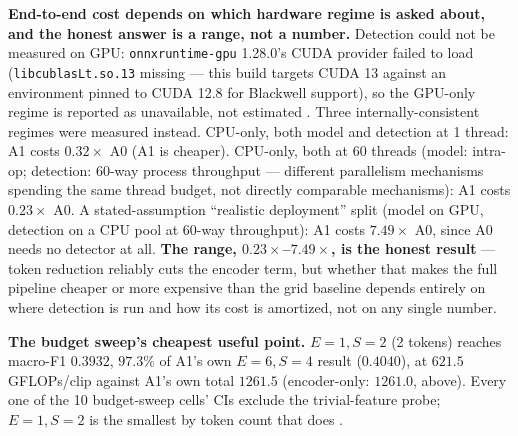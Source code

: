 \textbf{End-to-end cost depends on which hardware regime is asked about, and
the honest answer is a range, not a number.} Detection could not be measured
on GPU: \texttt{onnxruntime-gpu} 1.28.0's CUDA provider failed to load
(\texttt{libcublasLt.so.13} missing --- this build targets CUDA 13 against an
environment pinned to CUDA 12.8 for Blackwell support), so the GPU-only
regime is reported as unavailable, not estimated
. Three internally-consistent regimes were measured instead. CPU-only, both
model and detection at 1 thread: A1 costs
$0.32\times$ A0 (A1 is cheaper). CPU-only, both at 60 threads
(model: intra-op; detection: 60-way process throughput --- different
parallelism mechanisms spending the same thread budget, not directly
comparable mechanisms): A1 costs
$0.23\times$ A0. A stated-assumption ``realistic deployment'' split (model on
GPU, detection on a CPU pool at 60-way throughput): A1 costs
$7.49\times$ A0, since A0 needs no detector at all. \textbf{The range,
$0.23\times$--$7.49\times$, is the honest result} --- token reduction
reliably cuts the encoder term, but whether that makes the full pipeline
cheaper or more expensive than the grid baseline depends entirely on where
detection is run and how its cost is amortized, not on any single number.

\textbf{The budget sweep's cheapest useful point.}
$E{=}1,S{=}2$ (2 tokens) reaches macro-F1 $0.3932$, $97.3\%$ of A1's own
$E{=}6,S{=}4$ result ($0.4040$), at
$621.5$ GFLOPs/clip against A1's own
total $1261.5$ (encoder-only: $1261.0$, above). Every one of the 10
budget-sweep cells' CIs exclude the trivial-feature probe; $E{=}1,S{=}2$ is
the smallest by token count that does
.
